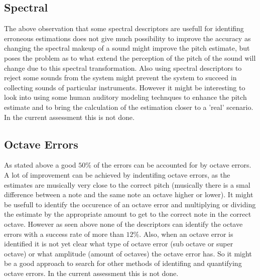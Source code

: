 \documentclass{proc}
\begin{document}
\subsection{Spectral}
The above observation that some spectral descriptors are usefull for identifing erroneous estimations does not give much possibility to improve the accuracy as changing the spectral makeup of a sound might improve the pitch estimate, but poses the problem as to what extend the perception of the pitch of the sound will change due to this spectral transformation. Also using spectral descriptors to reject some sounds from the system might prevent the system to succeed in collecting sounds of particular instruments. However it might be interesting to look into using some human auditory modeling technques to enhance the pitch estimate and to bring the calculation of the estimation closer to a 'real' scenario. In the current assessment this is not done.

\subsection{Octave Errors}
As stated above a good $50\%$ of the errors can be accounted for by octave errors. A lot of improvement can be achieved by indentifing octave errors, as the estimates are musically very close to the correct pitch (musically there is a smal difference between a note and the same note an octave higher or lower). It might be usefull to identify the occurence of an octave error and multiplying or dividing the estimate by the appropriate amount to get to the correct note in the correct octave. However as seen above none of the descriptors can identify the octave errors with a success rate of more than $12\%$. Also, when an octave error is identified it is not yet clear what type of octave error (sub octave or super octave) or what amplitude (amount of octaves) the octave error has. So it might be a good approach to search for other methods of identifing and quantifying octave errors. In the current assessment this is not done.




\end{document}
